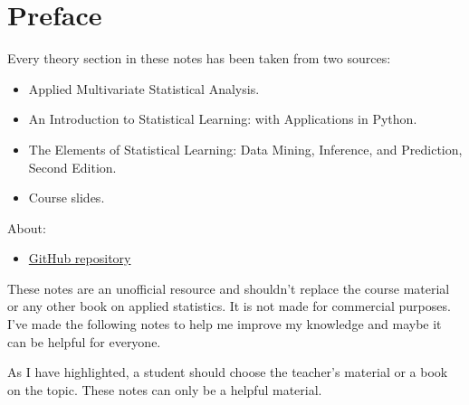 \section*{Preface}

Every theory section in these notes has been taken from two sources:
\begin{itemize}
    \item Applied Multivariate Statistical Analysis.\cite{johnson2007applied}
    \item An Introduction to Statistical Learning: with Applications in Python.\cite{james2013introduction}
    \item The Elements of Statistical Learning: Data Mining, Inference, and Prediction, Second Edition. \cite{hastie2009elements}
    \item Course slides.\cite{course-slides-polimi}
\end{itemize}
About:
\begin{itemize}
    \item[\faIcon{github}] \href{https://github.com/PoliMI-HPC-E-notes-projects-AndreVale69/HPC-E-PoliMI-university-notes}{GitHub repository}
    \begin{center}
    \end{center}
\end{itemize}
These notes are an unofficial resource and shouldn't replace the course material or any other book on applied statistics. It is not made for commercial purposes. I've made the following notes to help me improve my knowledge and maybe it can be helpful for everyone.

As I have highlighted, a student should choose the teacher's material or a book on the topic. These notes can only be a helpful material.